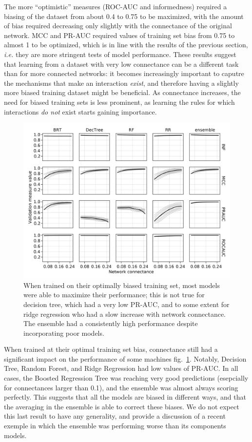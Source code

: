 \documentclass[10pt,oneside]{article}
\makeatletter
\def\maxwidth{\ifdim\Gin@nat@width>\linewidth\linewidth
\else\Gin@nat@width\fi}
\let\Oldincludegraphics\includegraphics
\renewcommand{\includegraphics}[1]{\Oldincludegraphics[width=\maxwidth]{#1}}
\makeatother
\begin{document}
The more ``optimistic'' measures (ROC-AUC and informedness) required a
biasing of the dataset from about 0.4 to 0.75 to be maximized, with the
amount of bias required decreasing only slightly with the connectance of
the original network. MCC and PR-AUC required values of training set
bias from 0.75 to almost 1 to be optimized, which is in line with the
results of the previous section, \emph{i.e.} they are more stringent
tests of model performance. These results suggest that learning from a
dataset with very low connectance can be a different task than for more
connected networks: it becomes increasingly important to caputre the
mechanisms that make an interaction \emph{exist}, and therefore having a
slightly more biased training dataset might be beneficial. As
connectance increases, the need for biased training sets is less
prominent, as learning the rules for which interactions \emph{do not}
exist starts gaining importance.

\begin{figure}
\hypertarget{fig:optimperf}{%
\centering
\includegraphics{figures/optim_perf.png}
\caption{When trained on their optimally biased training set, most
models were able to maximize their performance; this is not true for
decision tree, which had a very low PR-AUC, and to some extent for ridge
regression who had a slow increase with network connectance. The
ensemble had a consistently high performance despite incorporating poor
models.}\label{fig:optimperf}
}
\end{figure}

When trained at their optimal training set bias, connectance still had a
significant impact on the performance of some machines
fig.~\ref{fig:optimperf}. Notably, Decision Tree, Random Forest, and
Ridge Regression had low values of PR-AUC. In all cases, the Boosted
Regression Tree was reaching very good predictions (esepcially for
connectances larger than 0.1), and the ensemble was almost always
scoring perfectly. This suggests that all the models are biased in
different ways, and that the averaging in the ensemble is able to
correct these biases. We do not expect this last result to have any
generality, and provide a discussion of a recent exemple in which the
ensemble was performing worse than its components models.
\end{document}
